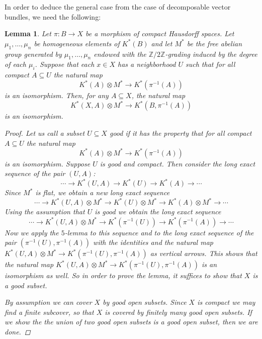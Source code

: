 \documentclass[12pt,a4paper]{amsart}
\theoremstyle{plain}
\newtheorem{lm}[thm]{Lemma}
\theoremstyle{definition}
\theoremstyle{remark}
\begin{document}
In order to deduce the general case from the case of decomposable vector bundles, we need the following:

\begin{lm}\label{lm:lerayhirsch}
  Let $\pi \colon B \to X$ be a morphism of compact Hausdorff spaces.
  Let $\mu_{1}, \ldots, \mu_{n}$ be homogeneous elements of $K^{*}(B)$ and let $M^{*}$ be the free abelian group generated by $\mu_{1}, \ldots, \mu_{n}$ endowed with the $\mathbb{Z}/2\mathbb{Z}$-grading induced by the degree of each $\mu_{i}$.
  Suppose that each $x \in X$ has a neighborhood $U$ such that for all compact $A \subseteq U$ the natural map
  \[ K^{*}(A) \otimes M^{*} \to K^{*}(\pi^{-1}(A)) \]
  is an isomorphism.
  Then, for any $A \subseteq X$, the natural map
  \[ K^{*}(X,A) \otimes M^{*} \to K^{*}(B, \pi^{-1}(A)) \]
  is an isomorphism.
  
  \begin{proof}
    Let us call a subset $U \subseteq X$ \textit{good} if it has the property that for all compact $A \subseteq U$ the natural map
    \[ K^{*}(A) \otimes M^{*} \to K^{*}(\pi^{-1}(A)) \]
    is an isomorphism.
    Suppose $U$ is good and compact.
    Then consider the long exact sequence of the pair $(U,A)$:
    \[ \cdots \to K^{*}(U,A) \to K^{*}(U) \to K^{*}(A) \to \cdots \]
    Since $M^{*}$ is flat, we obtain a new long exact sequence
    \[ \cdots \to K^{*}(U,A) \otimes M^{*} \to K^{*}(U) \otimes M^{*} \to K^{*}(A) \otimes M^{*} \to \cdots \]
    Using the assumption that $U$ is good we obtain the long exact sequence
    \[ \cdots \to K^{*}(U, A) \otimes M^{*} \to K^{*}(\pi^{-1}(U)) \to K^{*}(\pi^{-1}(A)) \to \cdots \]
    Now we apply the $5$-lemma to this sequence and to the long exact sequence of the pair $(\pi^{-1}(U), \pi^{-1}(A))$ with the identities and the natural map $K^{*}(U,A) \otimes M^{*} \to K^{*}(\pi^{-1}(U), \pi^{-1}(A))$ as vertical arrows.
    This shows that the natural map $K^{*}(U,A) \otimes M^{*} \to K^{*}(\pi^{-1}(U), \pi^{-1}(A))$ is an isomorphism as well.
    So in order to prove the lemma, it suffices to show that $X$ is a good subset.

    By assumption we can cover $X$ by good open subsets.
    Since $X$ is compact we may find a finite subcover, so that $X$ is covered by finitely many good open subsets.
    If we show the the union of two good open subsets is a good open subset, then we are done.


\end{proof}
\end{lm}
\end{document}
